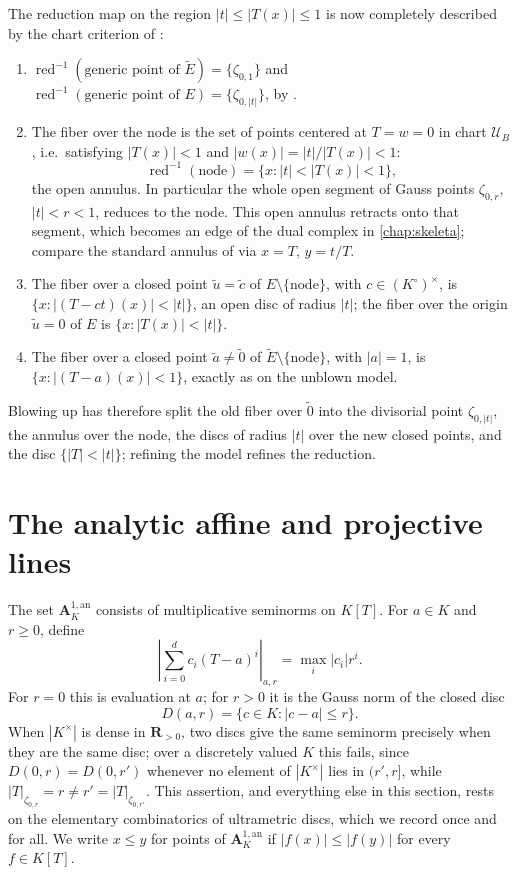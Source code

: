 \begin{example}
The reduction map on the region $|t|\leq|T(x)|\leq1$ is now completely
described by the chart criterion of
:
\begin{enumerate}
\item $\operatorname{red}^{-1}(\text{generic point of }\widetilde E)
      =\{\zeta_{0,1}\}$ and
      $\operatorname{red}^{-1}(\text{generic point of }E)
      =\{\zeta_{0,|t|}\}$, by
      .
\item The fiber over the node is the set of points centered at
      $T=w=0$ in chart $\mathcal U_B$, i.e.\ satisfying
      $|T(x)|<1$ and $|w(x)|=|t|/|T(x)|<1$:
      \[
       \operatorname{red}^{-1}(\text{node})
       =\{x:|t|<|T(x)|<1\},
      \]
      the open annulus.  In particular the whole open segment of Gauss
      points $\zeta_{0,r}$, $|t|<r<1$, reduces to the node.  This
      open annulus retracts onto that segment, which becomes an edge of
      the dual complex in \cref{chap:skeleta}; compare the standard
      annulus of  via $x=T$,
      $y=t/T$.
\item The fiber over a closed point $\tilde u=\tilde c$ of
      $E\setminus\{\text{node}\}$, with $c\in(K^\circ)^\times$, is
      $\{x:|(T-ct)(x)|<|t|\}$, an open disc of radius $|t|$; the
      fiber over the origin $\tilde u=0$ of $E$ is
      $\{x:|T(x)|<|t|\}$.
\item The fiber over a closed point $\tilde a\neq\tilde 0$ of
      $\widetilde E\setminus\{\text{node}\}$, with $|a|=1$, is
      $\{x:|(T-a)(x)|<1\}$, exactly as on the unblown model.
\end{enumerate}
Blowing up has therefore split the old fiber over $\tilde 0$ into the
divisorial point $\zeta_{0,|t|}$, the annulus over the node, the discs
of radius $|t|$ over the new closed points, and the disc
$\{|T|<|t|\}$; refining the model refines the reduction.
\end{example}

\section{The analytic affine and projective lines}
\label{sec:berk-line}

The set $\mathbf A^{1,\mathrm{an}}_K$ consists of multiplicative seminorms
on $K[T]$. For $a\in K$ and $r\geq0$, define
\[
 \left|\sum_{i=0}^d c_i(T-a)^i\right|_{a,r}
       =\max_i |c_i|r^i.
\]
For $r=0$ this is evaluation at $a$; for $r>0$ it is the Gauss norm of
the closed disc
\[
 D(a,r)=\{c\in K:|c-a|\leq r\}.
\]
When $|K^\times|$ is dense in $\mathbf R_{>0}$, two discs give the same
seminorm precisely when they are the same disc; over a discretely valued
$K$ this fails, since $D(0,r)=D(0,r')$ whenever no element of
$|K^\times|$ lies in $(r',r]$, while $|T|_{\zeta_{0,r}}=r\neq
r'=|T|_{\zeta_{0,r'}}$.  This assertion, and everything else in this
section, rests on the elementary combinatorics of ultrametric discs,
which we record once and for all.  We write $x\leq y$ for points of
$\mathbf A^{1,\mathrm{an}}_K$ if $|f(x)|\leq|f(y)|$ for every
$f\in K[T]$.

